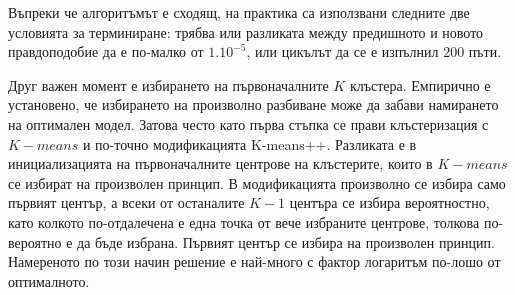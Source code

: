 \documentclass[main.tex]{subfiles}
\begin{document}
Въпреки че алгоритъмът е сходящ, на практика са използвани следните две условията за терминиране: трябва или разликата между предишното и новото правдоподобие да е по-малко от $1.10^{-5}$, или цикълът да се е изпълнил 200 пъти.

Друг важен момент е избирането на първоначалните $K$ клъстера. Емпирично е установено, че избирането на произволно разбиване може да забави намирането на оптимален модел. Затова често като първа стъпка се прави клъстеризация с $K-means$ и по-точно модификацията K-means++\cite{kmeans}. Разликата е в инициализацията на първоначалните центрове на клъстерите, които в $K-means$ се избират на произволен принцип. В модификацията произволно се избира само първият център, а всеки от останалите $K-1$ центъра се избира вероятностно, като колкото по-отдалечена е една точка от вече избраните центрове, толкова по-вероятно е да бъде избрана. Първият център се избира на произволен принцип. Намереното по този начин решение е най-много с фактор логаритъм по-лошо от оптималното.
\end{document}
